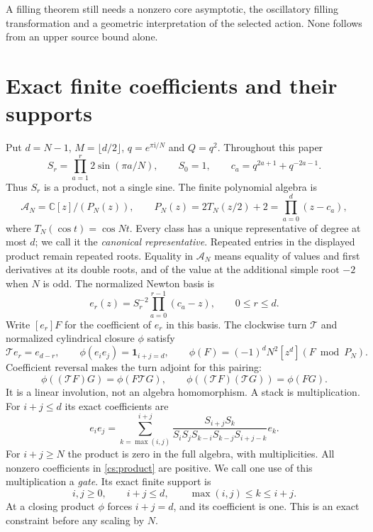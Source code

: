 \documentclass[11pt]{article}
\theoremstyle{remark}\newtheorem{remark}[theorem]{Remark}
\numberwithin{equation}{section}
\newcommand{\ii}{\mathrm i}
\newcommand{\Turn}{\mathcal T}
\begin{document}
A filling theorem still needs a nonzero core asymptotic, the oscillatory
filling transformation and a geometric interpretation of the selected
action. None follows from an upper source bound alone.

\section{Exact finite coefficients and their supports}\label{cs:finite}

Put $d=N-1$, $M=\lfloor d/2\rfloor$, $q=e^{\pi\ii/N}$ and $Q=q^2$. Throughout this paper
\[
 S_r=\prod_{a=1}^r2\sin(\pi a/N),\qquad S_0=1,
 \qquad c_a=q^{2a+1}+q^{-2a-1}.
\]
Thus $S_r$ is a product, not a single sine. The finite polynomial algebra is
\[
 \mathscr A_N=\mathbb C[z]/(P_N(z)),\qquad
 P_N(z)=2T_N(z/2)+2=\prod_{a=0}^{d}(z-c_a),
\]
where $T_N(\cos t)=\cos Nt$. Every class has a unique representative
of degree at most $d$; we call it the \emph{canonical representative}.
Repeated entries in the displayed product remain repeated roots.
Equality in $\mathscr A_N$ means equality of values and first derivatives
at its double roots, and of the value at the additional simple root
$-2$ when $N$ is odd.
The normalized Newton basis is
\begin{equation}\label{cs:basis}
 e_r(z)=S_r^{-2}\prod_{a=0}^{r-1}(c_a-z),\qquad 0\le r\le d.
\end{equation}
Write $[e_r]F$ for the coefficient of $e_r$ in this basis. The clockwise turn $\Turn$ and normalized cylindrical closure $\phi$ satisfy
\begin{equation}\label{cs:turn-trace}
 \Turn e_r=e_{d-r},\qquad \phi(e_i e_j)=\mathbf1_{i+j=d},\qquad
 \phi(F)=(-1)^dN^2[z^d](F\bmod P_N).
\end{equation}
Coefficient reversal makes the turn adjoint for this pairing:
\begin{equation}\label{cs:adjoint}
 \phi((\Turn F)G)=\phi(F\Turn G),\qquad
 \phi((\Turn F)(\Turn G))=\phi(FG).
\end{equation}
It is a linear involution, not an algebra homomorphism.
A stack is multiplication. For $i+j\le d$ its exact coefficients are
\begin{equation}\label{cs:product}
 e_i e_j=\sum_{k=\max(i,j)}^{i+j}
 \frac{S_{i+j}S_k}{S_iS_jS_{k-i}S_{k-j}S_{i+j-k}}e_k.
\end{equation}
For $i+j\ge N$ the product is zero in the full algebra, with multiplicities. All nonzero coefficients in \eqref{cs:product} are positive. We call one use of this multiplication a \emph{gate}. Its exact finite support is
\begin{equation}\label{cs:support}
 i,j\ge0,\qquad i+j\le d,\qquad \max(i,j)\le k\le i+j.
\end{equation}
At a closing product $\phi$ forces $i+j=d$, and its coefficient is one. This is an exact constraint before any scaling by $N$.
\end{document}
